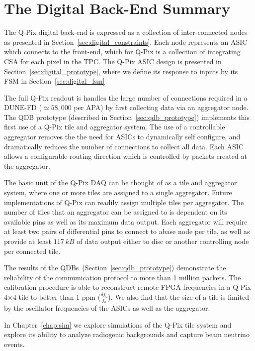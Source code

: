 \section{The Digital Back-End Summary}
The Q-Pix digital back-end is expressed as a collection of inter-connected nodes as presented in Section~\ref{sec:digital_constraints}.
Each node represents an ASIC which connects to the front-end, which for Q-Pix is a collection of integrating CSA for each pixel in the TPC.
The Q-Pix ASIC design is presented in Section~\ref{sec:digital_prototype}, where we define its response to inputs by its FSM in Section~\ref{sec:digital_fsm}

The full Q-Pix readout is handles the large number of connections required in a DUNE-FD ($\simeq 58,000$ per APA) by first collecting data via an aggregator node.
The QDB prototype (described in Section~\ref{sec:qdb_prototype}) implements this first use of a Q-Pix tile and aggregator system.
The use of a controllable aggregator removes the the need for ASICs to dynamically self configure, and dramatically reduces the number of connections to collect all data.
Each ASIC allows a configurable routing direction which is controlled by packets created at the aggregator.

The basic unit of the Q-Pix DAQ can be thought of as a tile and aggregator system, where one or more tiles are assigned to a single aggregator.
Future implementations of Q-Pix can readily assign multiple tiles per aggregator.
The number of tiles that an aggregator can be assigned to is dependent on its available pins as well as its maximum data output.
Each aggregator will require at least two pairs of differential pins to connect to abase node per tile, as well as provide at least $117~\unit{kB}$ of data output either to disc or another controlling node per connected tile.

The results of the QDBs~(Section~\ref{sec:qdb_prototype}) demonstrate the reliability of the communication protocol to more than 1 million packets.
The calibration procedure is able to reconstruct remote FPGA frequencies in a Q-Pix 4$\times$4 tile to better than 1 ppm ($\frac{\delta f_{o}}{f_{o}}$).
We also find that the size of a tile is limited by the oscillator frequencies of the ASICs as well as the aggregator.

In Chapter~\ref{chap:sim} we explore simulations of the Q-Pix tile system and explore its ability to analyze radiogenic backgrounds and capture beam neutrino events.
